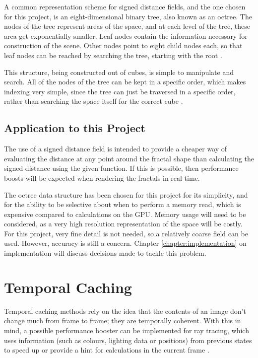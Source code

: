 A common representation scheme for signed distance fields, and the one chosen for this project, is an eight-dimensional binary tree, also known as an octree. The nodes of the tree represent areas of the space, and at each level of the tree, these area get exponentially smaller. Leaf nodes contain the information necessary for construction of the scene. Other nodes point to eight child nodes each, so that leaf nodes can be reached by searching the tree, starting with the root \cite{meagher1982geometric}.\newline

This structure, being constructed out of cubes, is simple to manipulate and search. All of the nodes of the tree can be kept in a specific order, which makes indexing very simple, since the tree can just be traversed in a specific order, rather than searching the space itself for the correct cube \cite{meagher1982geometric}.

\subsection{Application to this Project}

The use of a signed distance field is intended to provide a cheaper way of evaluating the distance at any point around the fractal shape than calculating the signed distance using the given function. If this is possible, then performance boosts will be expected when rendering the fractals in real time.\newline

The octree data structure has been chosen for this project for its simplicity, and for the ability to be selective about when to perform a memory read, which is expensive compared to calculations on the GPU. Memory usage will need to be considered, as a very high resolution representation of the space will be costly. For this project, very fine detail is not needed, so a relatively coarse field can be used. However, accuracy is still a concern. Chapter \ref{chapter:implementation} on implementation will discuss decisions made to tackle this problem.

\section{Temporal Caching} \label{section:temporal-caching}

Temporal caching methods rely on the idea that the contents of an image don't change much from frame to frame; they are temporally coherent. With this in mind, a possible performance booster can be implemented for ray tracing, which uses information (such as colours, lighting data or positions) from previous states to speed up or provide a hint for calculations in the current frame \cite{cosenza2008estimating}.\newline

